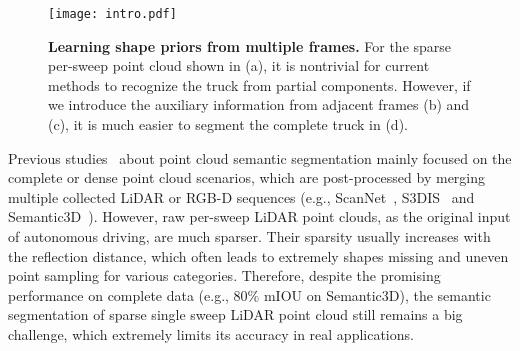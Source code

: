 \documentclass[letterpaper]{article} \usepackage{aaai21}  \usepackage{times}  \usepackage{helvet} \usepackage{courier}  \usepackage[hyphens]{url}  \usepackage{graphicx} \urlstyle{rm} \def\UrlFont{\rm}  \usepackage{natbib}  \usepackage{booktabs}
\begin{document}
	


	\begin{figure}[t]
		
	\noindent\texttt{[image: intro.pdf]}
		
		\caption{{\bf Learning shape priors from multiple frames.} 
For the sparse per-sweep point cloud shown in (a), it is nontrivial for current methods to recognize the truck from partial components. 
However, if we introduce the auxiliary information from adjacent frames (b) and (c), it is much easier to segment the complete truck in (d).}
		\label{fig:fig1}
		
	\end{figure}

Previous studies~\cite{Thomas_2019_ICCV,PointConv} about point cloud semantic segmentation mainly focused on the complete or dense point cloud scenarios, which are post-processed by merging multiple collected LiDAR or RGB-D sequences (e.g., ScanNet~\cite{scannet}, S3DIS~\cite{s3dis} and Semantic3D~\cite{hackel2017semantic3d}). 
However, raw per-sweep LiDAR point clouds, as the original input of autonomous driving, are much sparser. 
Their sparsity usually increases with the reflection distance, which often leads to extremely shapes missing and uneven point sampling for various categories. 
Therefore, despite the promising performance on complete data (e.g., 80\% mIOU on Semantic3D), the semantic segmentation of sparse single sweep LiDAR point cloud still remains a big challenge, which extremely limits its accuracy in real applications.
\end{document}
